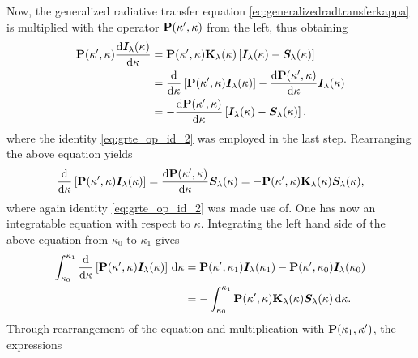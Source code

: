 \documentclass[a4paper,11pt]{report}
\begin{document}
Now, the generalized radiative transfer equation \cref{eq:generalizedradtransferkappa} is multiplied with the operator $\boldsymbol{\mathbf{P}}(\kappa^\prime, \kappa)$ from the left, thus obtaining \begin{align}
\begin{aligned}
\boldsymbol{\mathbf{P}}(\kappa^\prime,\kappa)\frac{\mathrm{d}\bm{I}_\lambda(\kappa)}{\mathrm{d}\kappa} &= \boldsymbol{\mathbf{P}}(\kappa^\prime,\kappa)\boldsymbol{\mathbf{K}}_\lambda(\kappa)\left[\bm{I}_\lambda(\kappa)-\bm{S}_\lambda(\kappa)\right] \\
&= \frac{\mathrm{d}}{\mathrm{d}\kappa}\left[\boldsymbol{\mathbf{P}}(\kappa^\prime,\kappa)\bm{I}_\lambda(\kappa)\right] - \frac{\mathrm{d}\boldsymbol{\mathbf{P}}(\kappa^\prime,\kappa)}{\mathrm{d}\kappa}\bm{I}_\lambda(\kappa) \\
&= -\frac{\mathrm{d}\boldsymbol{\mathbf{P}}(\kappa^\prime,\kappa)}{\mathrm{d}\kappa}\left[\bm{I}_\lambda(\kappa)-\bm{S}_\lambda(\kappa)\right],
\end{aligned}
\end{align} where the identity \cref{eq:grte_op_id_2} was employed in the last step. Rearranging the above equation yields \begin{align}
\begin{aligned}
\frac{\mathrm{d}}{\mathrm{d}\kappa}\left[\boldsymbol{\mathbf{P}}(\kappa^\prime,\kappa)\bm{I}_\lambda(\kappa)\right] = \frac{\mathrm{d}\boldsymbol{\mathbf{P}}(\kappa^\prime,\kappa)}{\mathrm{d}\kappa}\bm{S}_\lambda(\kappa) = -\boldsymbol{\mathbf{P}}(\kappa^\prime,\kappa)\boldsymbol{\mathbf{K}}_\lambda(\kappa)\bm{S}_\lambda(\kappa),
\end{aligned}
\end{align} where again identity \cref{eq:grte_op_id_2} was made use of. One has now an integratable equation with respect to $\kappa$. Integrating the left hand side of the above equation from $\kappa_0$ to $\kappa_1$ gives \begin{align}
\begin{aligned}
\int_{\kappa_0}^{\kappa_1}\frac{\mathrm{d}}{\mathrm{d}\kappa}\left[\boldsymbol{\mathbf{P}}(\kappa^\prime,\kappa)\bm{I}_\lambda(\kappa)\right]\,\mathrm{d}\kappa &= \boldsymbol{\mathbf{P}}(\kappa^\prime,\kappa_1)\bm{I}_\lambda(\kappa_1) - \boldsymbol{\mathbf{P}}(\kappa^\prime,\kappa_0)\bm{I}_\lambda(\kappa_0) \\
&= -\int_{\kappa_0}^{\kappa_1}\boldsymbol{\mathbf{P}}(\kappa^\prime,\kappa)\boldsymbol{\mathbf{K}}_\lambda(\kappa)\bm{S}_\lambda(\kappa)\,\mathrm{d}\kappa.
\end{aligned}
\end{align} Through rearrangement of the equation and multiplication with $\boldsymbol{\mathbf{P}}(\kappa_1,\kappa^\prime)$, the expressions \begin{align}

\end{align}
\end{document}

